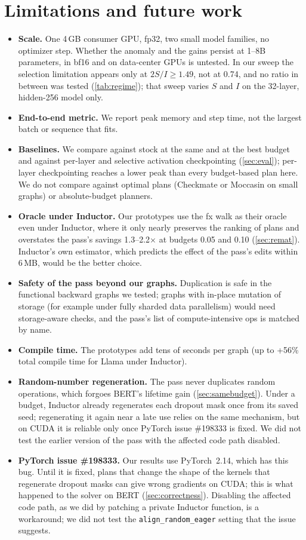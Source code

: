 \documentclass[10pt]{article}
\newcommand{\code}[1]{\texttt{#1}}
\begin{document}
\section{Limitations and future work}
\label{sec:limits}
\begin{itemize}
\item \textbf{Scale.} One 4\,GB consumer GPU, fp32, two small model families, no optimizer step. Whether the anomaly and the
gains persist at 1--8B parameters, in bf16 and on data-center GPUs is untested. In our sweep the selection limitation appears only at
$2S/I\geq1.49$, not at 0.74, and no ratio in between was tested (\cref{tab:regime}); that sweep varies $S$ and $I$ on the 32-layer, hidden-256 model only.
\item \textbf{End-to-end metric.} We report peak memory and step time, not the largest batch or sequence that fits.
\item \textbf{Baselines.} We compare against stock at the same and at the best budget and against per-layer and selective
activation checkpointing (\cref{sec:eval}); per-layer checkpointing reaches a lower peak than every budget-based plan
here. We do not compare against optimal plans (Checkmate or Moccasin on small graphs) or absolute-budget planners.
\item \textbf{Oracle under Inductor.} Our prototypes use the fx walk as their oracle even under Inductor, where it only nearly
preserves the ranking of plans and overstates the pass's savings 1.3--2.2$\times$ at budgets 0.05 and 0.10 (\cref{sec:remat}). Inductor's own
estimator, which predicts the effect of the pass's edits within 6\,MB, would be the better choice.
\item \textbf{Safety of the pass beyond our graphs.} Duplication is safe in the functional backward graphs we tested; graphs
with in-place mutation of storage (for example under fully sharded data parallelism) would need storage-aware checks, and
the pass's list of compute-intensive ops is matched by name.
\item \textbf{Compile time.} The prototypes add tens of seconds per graph (up to +56\% total compile time for Llama under
Inductor).
\item \textbf{Random-number regeneration.} The pass never duplicates random operations, which forgoes BERT's lifetime
gain (\cref{sec:samebudget}). Under a budget, Inductor already regenerates each dropout mask once from its saved seed;
regenerating it again near a late use relies on the same mechanism, but on CUDA it is reliable only once PyTorch issue
\#198333 is fixed. We did not test the earlier version of the pass with the affected code path disabled.
\item \textbf{PyTorch issue \#198333.} Our results use PyTorch~2.14, which has this bug. Until it is fixed, plans that
change the shape of the kernels that regenerate dropout masks can give wrong gradients on CUDA; this is what happened to
the solver on BERT (\cref{sec:correctness}). Disabling the affected code path, as we did by patching a private Inductor
function, is a workaround; we did not test the \code{align\_random\_eager} setting that the issue suggests.
\end{itemize}
\end{document}
